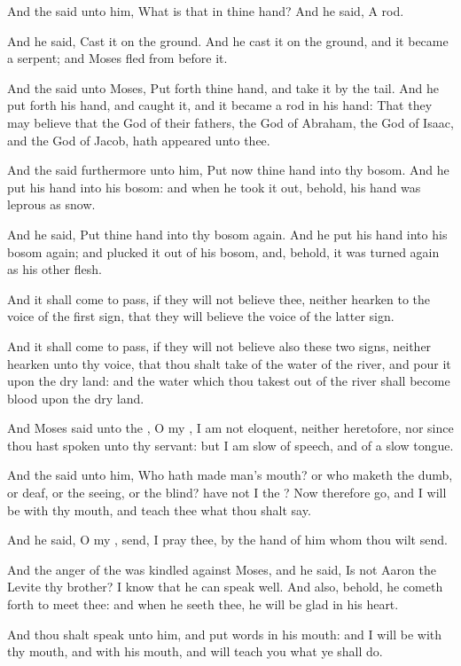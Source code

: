 \verse And the \LORD said unto him, What is that in thine hand? And he said, A rod.

\verse And he said, Cast it on the ground. And he cast it on the ground, and it became a serpent; and Moses fled from before it.

\verse And the \LORD said unto Moses, Put forth thine hand, and take it by the tail. And he put forth his hand, and caught it, and it became a rod in his hand: \verse That they may believe that the \LORD God of their fathers, the God of Abraham, the God of Isaac, and the God of Jacob, hath appeared unto thee.

\verse And the \LORD said furthermore unto him, Put now thine hand into thy bosom. And he put his hand into his bosom: and when he took it out, behold, his hand was leprous as snow.

\verse And he said, Put thine hand into thy bosom again. And he put his hand into his bosom again; and plucked it out of his bosom, and, behold, it was turned again as his other flesh.

\verse And it shall come to pass, if they will not believe thee, neither hearken to the voice of the first sign, that they will believe the voice of the latter sign.

\verse And it shall come to pass, if they will not believe also these two signs, neither hearken unto thy voice, that thou shalt take of the water of the river, and pour it upon the dry land: and the water which thou takest out of the river shall become blood upon the dry land.

\verse And Moses said unto the \LORD, O my \LORD, I am not eloquent, neither heretofore, nor since thou hast spoken unto thy servant: but I am slow of speech, and of a slow tongue.

\verse And the \LORD said unto him, Who hath made man's mouth? or who maketh the dumb, or deaf, or the seeing, or the blind? have not I the \LORD?  \verse Now therefore go, and I will be with thy mouth, and teach thee what thou shalt say.

\verse And he said, O my \LORD, send, I pray thee, by the hand of him whom thou wilt send.

\verse And the anger of the \LORD was kindled against Moses, and he said, Is not Aaron the Levite thy brother? I know that he can speak well.  And also, behold, he cometh forth to meet thee: and when he seeth thee, he will be glad in his heart.

\verse And thou shalt speak unto him, and put words in his mouth: and I will be with thy mouth, and with his mouth, and will teach you what ye shall do.

